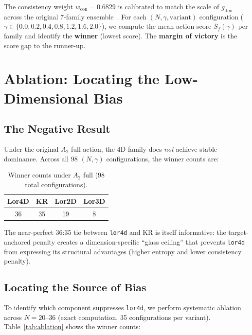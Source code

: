 \documentclass[entropy,article,submit,pdftex,moreauthors]{Definitions/mdpi}
\begin{document}
The consistency weight $w_{\text{con}} = 0.6829$ is calibrated to match the scale of $g_{\text{dim}}$ across the original 7-family ensemble~\cite{zhang2026companion}. For each $(N, \gamma, \text{variant})$ configuration ($\gamma \in \{0.0, 0.2, 0.4, 0.8, 1.2, 1.6, 2.0\}$), we compute the mean action score $\bar{S}_f(\gamma)$ per family and identify the \textbf{winner} (lowest score). The \textbf{margin of victory} is the score gap to the runner-up.

\section{Ablation: Locating the Low-Dimensional Bias}\label{sec:ablation}

\subsection{The Negative Result}

Under the original $A_2$ full action, the 4D family does \emph{not} achieve stable dominance. Across all 98 $(N, \gamma)$ configurations, the winner counts are:

\begin{table}[H]
\caption{Winner counts under $A_2$ full (98 total configurations).\label{tab:A2full}}
\begin{tabular}{cccc}
\toprule
Lor4D & KR & Lor2D & Lor3D \\
\midrule
36 & 35 & 19 & 8 \\
\bottomrule
\end{tabular}
\end{table}

The near-perfect 36:35 tie between \texttt{lor4d} and KR is itself informative: the target-anchored penalty creates a dimension-specific ``glass ceiling'' that prevents \texttt{lor4d} from expressing its structural advantages (higher entropy and lower consistency penalty).

\subsection{Locating the Source of Bias}

To identify which component suppresses \texttt{lor4d}, we perform systematic ablation across $N = 20$--$36$ (exact computation, 35 configurations per variant). Table~\ref{tab:ablation} shows the winner counts:
\end{document}
